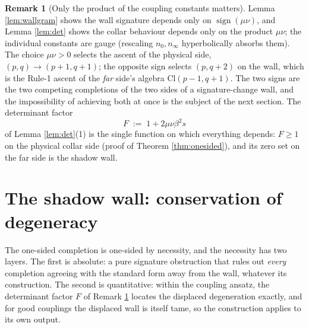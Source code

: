 \documentclass[11pt]{article}
\theoremstyle{definition}
\newtheorem{remark}[theorem]{Remark}
\newcommand{\Cl}{\mathrm{Cl}}
\newcommand{\nO}{n_0}
\newcommand{\nInf}{n_\infty}
\begin{document}
\begin{remark}[Only the product of the coupling constants matters]\label{rem:signchoice}
Lemma \ref{lem:wallgram} shows the wall signature depends only on $\operatorname{sign}(\mu\nu)$, and Lemma \ref{lem:det} shows the collar behaviour depends only on the product $\mu\nu$; the individual constants are gauge (rescaling $\nO, \nInf$ hyperbolically absorbs them). The choice $\mu\nu > 0$ selects the ascent of the physical side, $(p,q) \to (p{+}1,q{+}1)$; the opposite sign selects $(p,q{+}2)$ on the wall, which is the Rule-1 ascent of the \emph{far} side's algebra $\Cl(p{-}1,q{+}1)$. The two signs are the two competing completions of the two sides of a signature-change wall, and the impossibility of achieving both at once is the subject of the next section. The determinant factor
\[
F \;:=\; 1 + 2\mu\nu\beta^2 s
\]
of Lemma \ref{lem:det}(1) is the single function on which everything depends: $F \geq 1$ on the physical collar side (proof of Theorem \ref{thm:onesided}), and its zero set on the far side is the shadow wall.
\end{remark}

\section{The shadow wall: conservation of degeneracy}\label{sec:wall}

The one-sided completion is one-sided by necessity, and the necessity has two layers. The first is absolute: a pure signature obstruction that rules out \emph{every} completion agreeing with the standard form away from the wall, whatever its construction. The second is quantitative: within the coupling ansatz, the determinant factor $F$ of Remark \ref{rem:signchoice} locates the displaced degeneration exactly, and for good couplings the displaced wall is itself tame, so the construction applies to its own output.
\end{document}
